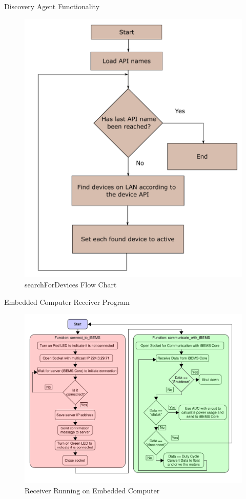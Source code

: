\documentclass{beamer}
\begin{document}
\begin{frame}{Discovery Agent Functionality}{}
    \begin{figure}
        \centering
        \includegraphics[scale=0.3]{figs/agents/searchForDevicesFlow.pdf}
        \caption{searchForDevices Flow Chart}
        \label{fig:searchForDevices}
    \end{figure}
\end{frame}


\begin{frame}{Embedded Computer Receiver Program}{}
    \begin{figure}
        \centering
        \includegraphics[scale=0.30]{figs/beaglebone/Beaglebone_Receiver_Diagram.pdf}
        \caption{Receiver Running on Embedded Computer}
        \label{fig:Beaglebone_Receiver_Diagram}
    \end{figure}
\end{frame}
\end{document}
